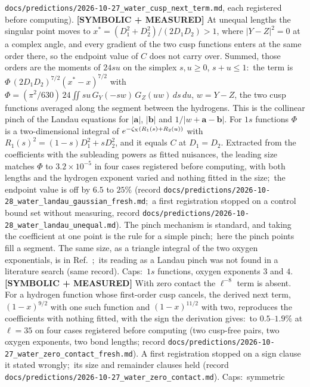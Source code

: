 \documentclass[aps,pra,twocolumn,superscriptaddress,longbibliography]{revtex4-2}
\begin{document}
\texttt{docs/predictions/2026-10-27\_water\_cusp\_next\_term.md}, each registered before
computing).  \textbf{[SYMBOLIC + MEASURED]} At unequal lengths the singular point moves to
$x^{*}=(D_1^{2}+D_2^{2})/(2D_1D_2)>1$, where $|Y-Z|^{2}=0$ at a complex angle, and every
gradient of the two cusp functions enters at the same order there, so the endpoint value of
$C$ does not carry over.  Summed, those orders are the moments of $24su$ on the simplex
$s,u\ge0$, $s+u\le1$:\ the term is $\Phi\,(2D_1D_2)^{7/2}(x^{*}-x)^{7/2}$ with
$\Phi=(\pi^{2}/630)\,24\iint su\,G_Y(-sw)\,G_Z(uw)\,ds\,du$, $w=Y-Z$, the two cusp functions
averaged along the segment between the hydrogens.  This is the collinear pinch of the Landau
equations for $|\mathbf{a}|$, $|\mathbf{b}|$ and $1/|w+\mathbf{a}-\mathbf{b}|$.  For $1s$
functions $\Phi$ is a two-dimensional integral of
$e^{-\zeta_{\rm X}(R_1(s)+R_2(u))}$ with $R_1(s)^{2}=(1-s)D_1^{2}+sD_2^{2}$, and it equals $C$
at $D_1=D_2$.  Extracted from the coefficients with the subleading powers as fitted
nuisances, the leading size matches $\Phi$ to $3.2\times10^{-5}$ in four cases registered before
computing, with both lengths and the hydrogen exponent varied and nothing fitted in the
size;\ the endpoint value is off by $6.5$ to $25\%$ (record
\texttt{docs/predictions/2026-10-28\_water\_landau\_gaussian\_fresh.md};\ a first registration
stopped on a control bound set without measuring, record
\texttt{docs/predictions/2026-10-28\_water\_landau\_unequal.md}).  The pinch mechanism is
standard, and taking the coefficient at one point is the rule for a simple pinch;\ here the
pinch points fill a segment.  The same size, as a triangle integral of the two oxygen
exponentials, is in Ref.~\cite{matuzas2026sc};\ its reading as a Landau pinch was not found in a
literature search (same record).  Caps:\ $1s$ functions, oxygen exponents
$3$ and $4$.  \textbf{[SYMBOLIC + MEASURED]} With zero contact the $\ell^{-8}$ term is absent.
For a hydrogen function whose first-order cusp cancels, the derived next term, $(1-x)^{9/2}$
with one such function and $(1-x)^{11/2}$ with two, reproduces the coefficients with nothing
fitted, with the sign the derivation gives:\ to $0.5$--$1.9\%$ at $\ell=35$ on four cases
registered before computing (two cusp-free pairs, two oxygen exponents, two bond lengths;
record \texttt{docs/predictions/2026-10-27\_water\_zero\_contact\_fresh.md}).  A first
registration stopped on a sign clause it stated wrongly;\ its size and remainder clauses held
(record \texttt{docs/predictions/2026-10-27\_water\_zero\_contact.md}).  Caps:\ symmetric
\end{document}
